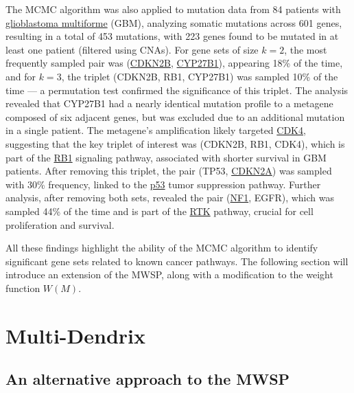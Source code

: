 The MCMC algorithm was also applied to mutation data from 84 patients with \href{https://en.wikipedia.org/wiki/Glioblastoma}{glioblastoma multiforme} (GBM), analyzing somatic mutations across 601 genes, resulting in a total of 453 mutations, with 223 genes found to be mutated in at least one patient (filtered using CNAs). For gene sets of size $k = 2$, the most frequently sampled pair was (\href{https://en.wikipedia.org/wiki/CDKN2B}{CDKN2B}, \href{https://en.wikipedia.org/wiki/25-Hydroxyvitamin_D_1-alpha-hydroxylase}{CYP27B1}), appearing 18\% of the time, and for $k = 3$, the triplet (CDKN2B, RB1, CYP27B1) was sampled 10\% of the time --- a permutation test confirmed the significance of this triplet. The analysis revealed that CYP27B1 had a nearly identical mutation profile to a metagene composed of six adjacent genes, but was excluded due to an additional mutation in a single patient. The metagene's amplification likely targeted \href{https://en.wikipedia.org/wiki/Cyclin-dependent_kinase_4}{CDK4}, suggesting that the key triplet of interest was (CDKN2B, RB1, CDK4), which is part of the \href{https://en.wikipedia.org/wiki/Retinoblastoma_protein}{RB1} signaling pathway, associated with shorter survival in GBM patients. After removing this triplet, the pair (TP53, \href{https://en.wikipedia.org/wiki/CDKN2A}{CDKN2A}) was sampled with 30\% frequency, linked to the \href{https://en.wikipedia.org/wiki/P53}{p53} tumor suppression pathway. Further analysis, after removing both sets, revealed the pair (\href{https://en.wikipedia.org/wiki/Neurofibromatosis_type_I}{NF1}, EGFR), which was sampled 44\% of the time and is part of the \href{https://en.wikipedia.org/wiki/Receptor_tyrosine_kinase}{RTK} pathway, crucial for cell proliferation and survival.

All these findings highlight the ability of the MCMC algorithm to identify significant gene sets related to known cancer pathways. The following section will introduce an extension of the MWSP, along with a modification to the weight function $W(M)$.

\section{Multi-Dendrix}

\subsection{An alternative approach to the MWSP} \label{multi-dendrix_chap3_first_sect}

